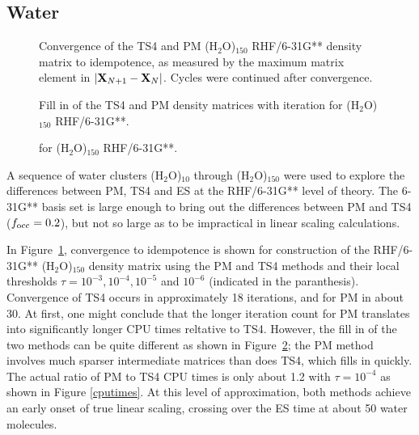 \commentoutA{\documentclass[prb,aps,twocolumn,twocolumngrid,secnumarabic,superbib,hyperref]{revtex4}}
\begin{document}
{\subsection{Water}

\begin{figure}[t]
\caption{Convergence of the TS4 and PM  (H$_2$O)$_{150}$ RHF/6-31G** 
density matrix to idempotence, as measured by the maximum matrix element in 
$|{\bf X}_{N+1}-{\bf X}_N|$. Cycles were continued after convergence.}\label{waterconvergence}
\end{figure}

\begin{figure}[t]
\caption{Fill in of the TS4 and PM density matrices with iteration
for (H$_2$O)$_{150}$ RHF/6-31G**.} \label{fillin}
\end{figure}

\begin{figure}[t]
\caption{for (H$_2$O)$_{150}$ RHF/6-31G**.} \label{EigenBounds}
\end{figure}

A sequence of water clusters (H$_2$O)$_{10}$ through (H$_2$O)$_{150}$  \cite{WaterCluster}
were used to explore the differences between PM, TS4 and ES at the RHF/6-31G** level of theory.  
The 6-31G** basis set is large enough to bring out the differences between PM and TS4 
($f_{\rm occ}=0.2$), but not so large as to be impractical in linear scaling calculations.  

In Figure~\ref{waterconvergence}, convergence to idempotence is shown for 
construction of the  RHF/6-31G** (H$_2$O)$_{150}$ density matrix using the PM and TS4 methods
and their local thresholds $\tau=10^{-3}, 10^{-4}, 10^{-5}$ and $10^{-6}$ (indicated
in the paranthesis). Convergence
of TS4 occurs in approximately 18 iterations, and for PM in about 30.  At first, 
one might conclude that the longer iteration count for PM translates into significantly 
longer CPU times reltative to TS4. However, the fill in of the two methods
can be quite different as shown in Figure~\ref{fillin};  the PM method involves much
sparser intermediate matrices than does TS4, which fills in quickly.  The actual ratio
of PM to TS4 CPU times is only about 1.2 with $\tau=10^{-4}$ as shown in 
Figure \ref{cputimes}. At this level of approximation, both methods achieve 
an early onset of true linear scaling, crossing  over the ES time at about 50 water 
molecules. 

}
\end{document}
